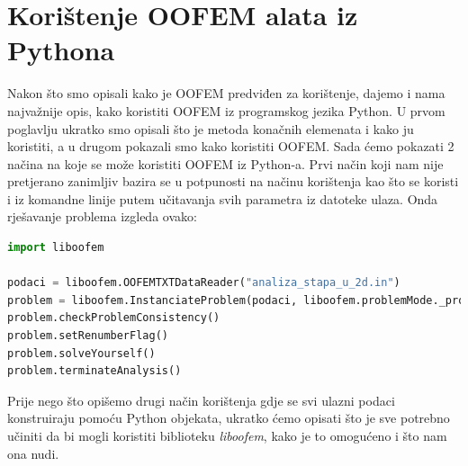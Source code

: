 \documentclass[a4paper,twoside,12pt]{memoir} %
\begin{document}



\section{Korištenje OOFEM alata iz Pythona}
\label{poglavlje:koristenje_pythona}
Nakon što smo opisali kako je OOFEM predviđen za korištenje, dajemo i nama najvažnije opis, kako koristiti OOFEM iz programskog jezika Python. U prvom poglavlju ukratko smo opisali što je metoda konačnih elemenata i kako ju koristiti, a u drugom pokazali smo kako koristiti OOFEM. Sada ćemo pokazati 2 načina na koje se može koristiti OOFEM iz Python-a. Prvi način koji nam nije pretjerano zanimljiv bazira se u potpunosti na načinu korištenja kao što se koristi i iz komandne linije putem učitavanja svih parametra iz datoteke ulaza. Onda rješavanje problema izgleda ovako:

\begin{lstlisting}[language=python, label={code:python_oofem_from_file}, caption={Pokretanje OOFEM alata pomoću Python-a i učitavanje ulaznih podataka iz datoteke}]
import liboofem

podaci = liboofem.OOFEMTXTDataReader("analiza_stapa_u_2d.in")
problem = liboofem.InstanciateProblem(podaci, liboofem.problemMode._processor, 0)
problem.checkProblemConsistency()
problem.setRenumberFlag()
problem.solveYourself()
problem.terminateAnalysis()
\end{lstlisting}

Prije nego što opišemo drugi način korištenja gdje se svi ulazni podaci konstruiraju pomoću Python objekata, ukratko ćemo opisati što je sve potrebno učiniti da bi mogli koristiti biblioteku \textit{liboofem}, kako je to omogućeno i što nam ona nudi. \par
\end{document}
